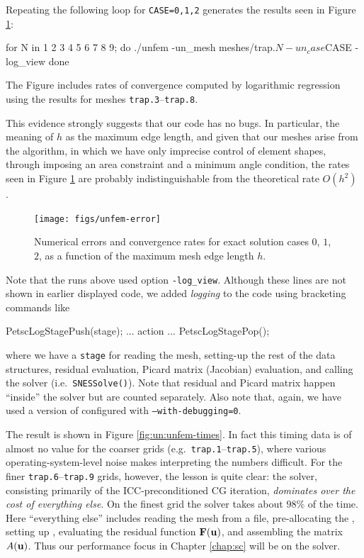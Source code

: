 Repeating the following loop for \texttt{CASE=0,1,2} generates the results seen in Figure \ref{fig:un:unfem-error}:
\begin{code}
for N in 1 2 3 4 5 6 7 8 9; do
    ./unfem -un_mesh meshes/trap.$N -un_case $CASE -log_view
done
\end{code}
The Figure includes rates of convergence computed by logarithmic regression using the results for meshes \texttt{trap.3}--\texttt{trap.8}.

This evidence strongly suggests that our code has no bugs.  In particular, the meaning of $h$ as the maximum edge length, and given that our meshes arise from the \Triangle algorithm, in which we have only imprecise control of element shapes, through imposing an area constraint and a minimum angle condition, the rates seen in Figure \ref{fig:un:unfem-error} are probably indistinguishable from the theoretical rate $O(h^2)$ \citep{Braess2007}.

\begin{figure}
\texttt{[image: figs/unfem-error]}
\caption{Numerical errors and convergence rates for exact solution cases $0$, $1$, $2$, as a function of the maximum mesh edge length $h$.}
\label{fig:un:unfem-error}
\end{figure}

Note that the runs above used option \texttt{-log\_view}.  Although these lines are not shown in earlier displayed code, we added \emph{logging} to the code using bracketing \PETSc commands like
\begin{code}
    PetscLogStagePush(stage);
    ... action ...
    PetscLogStagePop();
\end{code}
where we have a \texttt{stage} for reading the mesh, setting-up the rest of the data structures, residual evaluation, Picard matrix (Jacobian) evaluation, and calling the solver (i.e.~\texttt{SNESSolve()}).  Note that residual and Picard matrix happen ``inside'' the solver but are counted separately.  Also note that, again, we have used a version of \PETSc configured with \texttt{--with-debugging=0}.

The result is shown in Figure \ref{fig:un:unfem-times}.  In fact this timing data is of almost no value for the coarser grids (e.g.~\texttt{trap.1}--\texttt{trap.5}), where various operating-system-level noise makes interpreting the numbers difficult.  For the finer \texttt{trap.6}--\texttt{trap.9} grids, however, the lesson is quite clear: the solver, consisting primarily of the ICC-preconditioned CG iteration, \emph{dominates over the cost of everything else}.  On the finest grid the solver takes about $98\%$ of the time.  Here ``everything else'' includes reading the mesh from a file, pre-allocating the \pMat, setting up \pVecs, evaluating the residual function $\mathbf{F}(\mathbf{u})$, and assembling the matrix $A(\mathbf{u})$.  Thus our performance focus in Chapter \ref{chap:sc} will be on the solver.

